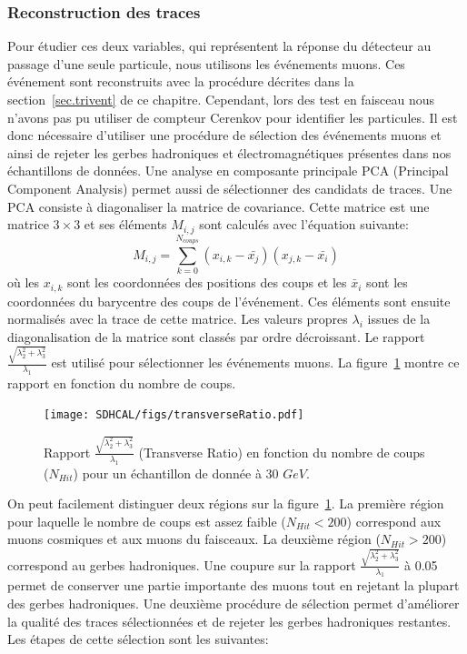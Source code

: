 \subsubsection{Reconstruction des traces}
Pour étudier ces deux variables, qui représentent la réponse du détecteur au passage d'une seule particule, nous utilisons les événements muons. Ces événement sont reconstruits avec la procédure décrites dans la section~\ref{sec.trivent} de ce chapitre. Cependant, lors des test en faisceau nous n'avons pas pu utiliser de compteur Cerenkov pour identifier les particules. Il est donc nécessaire d'utiliser une procédure de sélection des événements muons et ainsi de rejeter les gerbes hadroniques et électromagnétiques présentes dans nos échantillons de données. Une analyse en composante principale PCA (Principal Component Analysis) permet aussi de sélectionner des candidats de traces. Une PCA consiste à diagonaliser la matrice de covariance. Cette matrice est une matrice $3\times3$ et ses éléments $M_{i,j}$ sont calculés avec l'équation suivante:
\begin{equation}
  M_{i,j}=\sum_{k=0}^{N_{coups}}{(x_{i,k}-\bar{x_j})(x_{j,k}-\bar{x_i})}
\end{equation}
où les $x_{i,k}$ sont les coordonnées des positions des coups et les $\bar x_i$ sont les coordonnées du barycentre des coups de l'événement. Ces éléments sont ensuite normalisés avec la trace de cette matrice. Les valeurs propres $\lambda_i$ issues de la diagonalisation de la matrice sont classés par ordre décroissant. Le rapport $\frac{\sqrt{\lambda_2^2+\lambda_3^2}}{\lambda_1}$ est utilisé pour sélectionner les événements muons. La figure~\ref{fig:transverseRatio} montre ce rapport en fonction du nombre de coups. 
\begin{figure}[!h]
  \begin{center}
    \texttt{[image: SDHCAL/figs/transverseRatio.pdf]}
    \caption{Rapport $\frac{\sqrt{\lambda_2^2+\lambda_3^2}}{\lambda_1}$ (Transverse Ratio) en fonction du nombre de coups ($N_{Hit}$) pour un échantillon de donnée à 30 $GeV$.}
    \label{fig:transverseRatio}
  \end{center}
\end{figure}
On peut facilement distinguer deux régions sur la figure~\ref{fig:transverseRatio}. La première région pour laquelle le nombre de coups est assez faible ($N_{Hit}<200$) correspond aux muons cosmiques et aux muons du faisceaux. La deuxième région ($N_{Hit}>200$) correspond au gerbes hadroniques. Une coupure sur la rapport $\frac{\sqrt{\lambda_2^2+\lambda_3^2}}{\lambda_1}$ à 0.05 permet de conserver une partie importante des muons tout en rejetant la plupart des gerbes hadroniques. Une deuxième procédure de sélection permet d'améliorer la qualité des traces sélectionnées et de rejeter les gerbes hadroniques restantes. Les étapes de cette sélection sont les suivantes:
